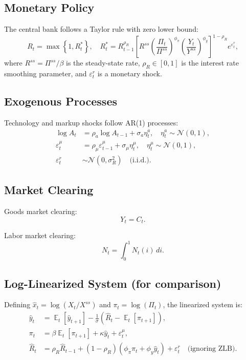 \documentclass[12pt]{article}
\theoremstyle{plain}
\theoremstyle{definition}
\theoremstyle{remark}
\DeclareMathOperator{\E}{\mathbb{E}}
\newcommand{\eps}{\varepsilon}
\begin{document}
\subsection{Monetary Policy}

The central bank follows a Taylor rule with zero lower bound:
\begin{equation}
R_t = \max\left\{1, R_t^* \right\}, \quad R_t^* = R_{t-1}^{\rho_R} \left[ R^{ss} \left(\frac{\Pi_t}{\Pi^{ss}}\right)^{\phi_\pi} \left(\frac{Y_t}{Y^{ss}}\right)^{\phi_y} \right]^{1-\rho_R} e^{\eps_t^r}, \label{eq:taylor_zlb_full}
\end{equation}
where $R^{ss} = \Pi^{ss}/\beta$ is the steady-state rate, $\rho_R \in [0,1]$ is the interest rate smoothing parameter, and $\eps_t^r$ is a monetary shock.


\subsection{Exogenous Processes}

Technology and markup shocks follow AR(1) processes:
\begin{align}
\log A_t &= \rho_a \log A_{t-1} + \sigma_a \eta_t^a, \quad \eta_t^a \sim \mathcal{N}(0,1), \\
\eps_t^\mu &= \rho_\mu \eps_{t-1}^\mu + \sigma_\mu \eta_t^\mu, \quad \eta_t^\mu \sim \mathcal{N}(0,1), \\
\eps_t^r &\sim \mathcal{N}(0, \sigma_R^2) \quad \text{(i.i.d.)}.
\end{align}


\subsection{Market Clearing}

Goods market clearing:
\begin{equation}
Y_t = C_t.
\end{equation}

Labor market clearing:
\begin{equation}
N_t = \int_0^1 N_t(i) \, di.
\end{equation}


\subsection{Log-Linearized System (for comparison)}

Defining $\hat{x}_t = \log(X_t/X^{ss})$ and $\pi_t = \log(\Pi_t)$, the linearized system is:
\begin{align}
\hat{y}_t &= \E_t[\hat{y}_{t+1}] - \frac{1}{\sigma}(\hat{R}_t - \E_t[\pi_{t+1}]), \\
\pi_t &= \beta \E_t[\pi_{t+1}] + \kappa \hat{y}_t + \eps_t^\mu, \\
\hat{R}_t &= \rho_R \hat{R}_{t-1} + (1-\rho_R)(\phi_\pi \pi_t + \phi_y \hat{y}_t) + \eps_t^r \quad \text{(ignoring ZLB)}.
\end{align}
\end{document}
